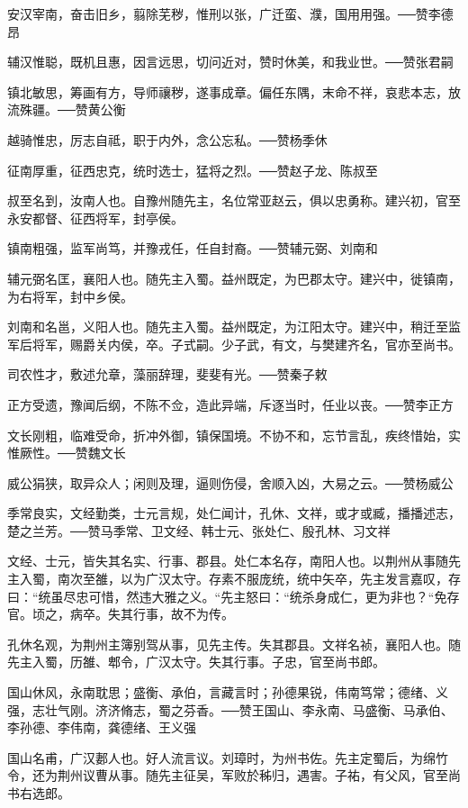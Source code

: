 \documentclass[12pt,UTF8]{ctexbook}
\begin{document}
安汉宰南，奋击旧乡，翦除芜秽，惟刑以张，广迁蛮、濮，国用用强。──赞李德昂

辅汉惟聪，既机且惠，因言远思，切问近对，赞时休美，和我业世。──赞张君嗣

镇北敏思，筹画有方，导师禳秽，遂事成章。偏任东隅，末命不祥，哀悲本志，放流殊疆。──赞黄公衡

越骑惟忠，厉志自祗，职于内外，念公忘私。──赞杨季休

征南厚重，征西忠克，统时选士，猛将之烈。──赞赵子龙、陈叔至

叔至名到，汝南人也。自豫州随先主，名位常亚赵云，俱以忠勇称。建兴初，官至永安都督、征西将军，封亭侯。

镇南粗强，监军尚笃，并豫戎任，任自封裔。──赞辅元弼、刘南和

辅元弼名匡，襄阳人也。随先主入蜀。益州既定，为巴郡太守。建兴中，徙镇南，为右将军，封中乡侯。

刘南和名邕，义阳人也。随先主入蜀。益州既定，为江阳太守。建兴中，稍迁至监军后将军，赐爵关内侯，卒。子式嗣。少子武，有文，与樊建齐名，官亦至尚书。

司农性才，敷述允章，藻丽辞理，斐斐有光。──赞秦子敕

正方受遗，豫闻后纲，不陈不佥，造此异端，斥逐当时，任业以丧。──赞李正方

文长刚粗，临难受命，折冲外御，镇保国境。不协不和，忘节言乱，疾终惜始，实惟厥性。──赞魏文长

威公狷狭，取异众人；闲则及理，逼则伤侵，舍顺入凶，大易之云。──赞杨威公

季常良实，文经勤类，士元言规，处仁闻计，孔休、文祥，或才或臧，播播述志，楚之兰芳。──赞马季常、卫文经、韩士元、张处仁、殷孔林、习文祥

文经、士元，皆失其名实、行事、郡县。处仁本名存，南阳人也。以荆州从事随先主入蜀，南次至雒，以为广汉太守。存素不服庞统，统中矢卒，先主发言嘉叹，存曰：“统虽尽忠可惜，然违大雅之义。“先主怒曰：“统杀身成仁，更为非也？“免存官。顷之，病卒。失其行事，故不为传。

孔休名观，为荆州主簿别驾从事，见先主传。失其郡县。文祥名祯，襄阳人也。随先主入蜀，历雒、郫令，广汉太守。失其行事。子忠，官至尚书郎。

国山休风，永南耽思；盛衡、承伯，言藏言时；孙德果锐，伟南笃常；德绪、义强，志壮气刚。济济脩志，蜀之芬香。──赞王国山、李永南、马盛衡、马承伯、李孙德、李伟南，龚德绪、王义强

国山名甫，广汉郪人也。好人流言议。刘璋时，为州书佐。先主定蜀后，为绵竹令，还为荆州议曹从事。随先主征吴，军败於秭归，遇害。子祐，有父风，官至尚书右选郎。
\end{document}
